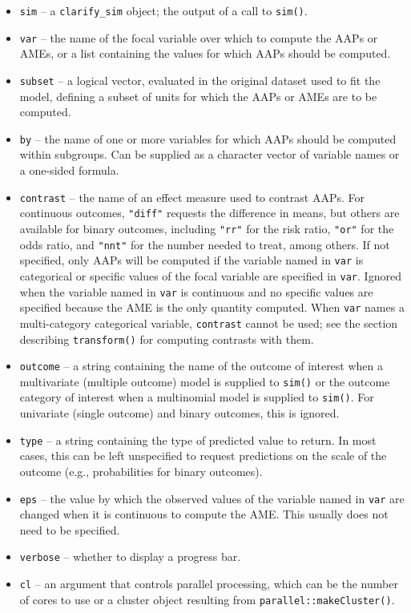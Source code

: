 \begin{itemize}
\item
  \texttt{sim} -- a \texttt{clarify\_sim} object; the output of a call to \texttt{sim()}.
\item
  \texttt{var} -- the name of the focal variable over which to compute the AAPs or AMEs, or a list containing the values for which AAPs should be computed.
\item
  \texttt{subset} -- a logical vector, evaluated in the original dataset used to fit the model, defining a subset of units for which the AAPs or AMEs are to be computed.
\item
  \texttt{by} -- the name of one or more variables for which AAPs should be computed within subgroups. Can be supplied as a character vector of variable names or a one-sided formula.
\item
  \texttt{contrast} -- the name of an effect measure used to contrast AAPs. For continuous outcomes, \texttt{"diff"} requests the difference in means, but others are available for binary outcomes, including \texttt{"rr"} for the risk ratio, \texttt{"or"} for the odds ratio, and \texttt{"nnt"} for the number needed to treat, among others. If not specified, only AAPs will be computed if the variable named in \texttt{var} is categorical or specific values of the focal variable are specified in \texttt{var}. Ignored when the variable named in \texttt{var} is continuous and no specific values are specified because the AME is the only quantity computed. When \texttt{var} names a multi-category categorical variable, \texttt{contrast} cannot be used; see the section describing \texttt{transform()} for computing contrasts with them.
\item
  \texttt{outcome} -- a string containing the name of the outcome of interest when a multivariate (multiple outcome) model is supplied to \texttt{sim()} or the outcome category of interest when a multinomial model is supplied to \texttt{sim()}. For univariate (single outcome) and binary outcomes, this is ignored.
\item
  \texttt{type} -- a string containing the type of predicted value to return. In most cases, this can be left unspecified to request predictions on the scale of the outcome (e.g., probabilities for binary outcomes).
\item
  \texttt{eps} -- the value by which the observed values of the variable named in \texttt{var} are changed when it is continuous to compute the AME. This usually does not need to be specified.
\item
  \texttt{verbose} -- whether to display a progress bar.
\item
  \texttt{cl} -- an argument that controls parallel processing, which can be the number of cores to use or a cluster object resulting from \texttt{parallel::makeCluster()}.
\end{itemize}
